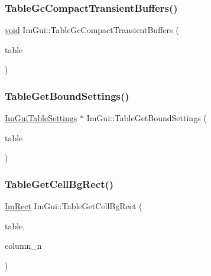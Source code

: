 \mbox{\label{namespaceImGui_ac176c3d1c667f88d2272376e0b141503}} 
\subsubsection{\texorpdfstring{Table\+Gc\+Compact\+Transient\+Buffers()}{TableGcCompactTransientBuffers()}\hspace{0.1cm}{\footnotesize\ttfamily [2/2]}}
{\footnotesize\ttfamily \hyperlink{imgui__impl__opengl3__loader_8h_ac668e7cffd9e2e9cfee428b9b2f34fa7}{void} Im\+Gui\+::\+Table\+Gc\+Compact\+Transient\+Buffers (\begin{DoxyParamCaption}\item[{\hyperlink{structImGuiTableTempData}{Im\+Gui\+Table\+Temp\+Data} $\ast$}]{table }\end{DoxyParamCaption})}

\mbox{\label{namespaceImGui_a4824b64a0052e57fdb17c90331fb39cd}} 
\subsubsection{\texorpdfstring{Table\+Get\+Bound\+Settings()}{TableGetBoundSettings()}}
{\footnotesize\ttfamily \hyperlink{structImGuiTableSettings}{Im\+Gui\+Table\+Settings} $\ast$ Im\+Gui\+::\+Table\+Get\+Bound\+Settings (\begin{DoxyParamCaption}\item[{\hyperlink{structImGuiTable}{Im\+Gui\+Table} $\ast$}]{table }\end{DoxyParamCaption})}

\mbox{\label{namespaceImGui_aa778a80828627fcd199784f4591a97d1}} 
\subsubsection{\texorpdfstring{Table\+Get\+Cell\+Bg\+Rect()}{TableGetCellBgRect()}}
{\footnotesize\ttfamily \hyperlink{structImRect}{Im\+Rect} Im\+Gui\+::\+Table\+Get\+Cell\+Bg\+Rect (\begin{DoxyParamCaption}\item[{const \hyperlink{structImGuiTable}{Im\+Gui\+Table} $\ast$}]{table,  }\item[{int}]{column\+\_\+n }\end{DoxyParamCaption})}

